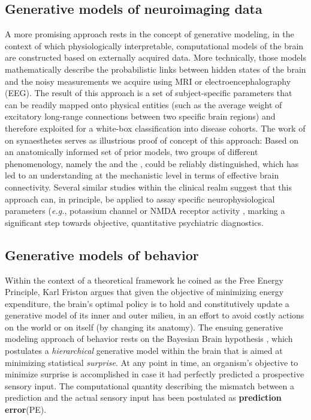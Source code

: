 \documentclass{article}
\begin{document}
\begin{multicols}{2}
\subsection*{Generative models of neuroimaging data}
A more promising approach rests in the concept of \textsf{generative modeling}, in the context of which physiologically interpretable, computational models of the brain are constructed based on externally acquired data. More technically, those models mathematically describe the probabilistic links between hidden states of the brain and the noisy measurements we acquire using MRI or electroencephalography (EEG). The result of this approach is a set of subject-specific parameters that can be readily mapped onto physical entities (such as the average weight of excitatory long-range connections between two specific brain regions) and therefore exploited for a white-box classification into disease cohorts. The work of \cite{VanLeeuwen2011} on synaesthetes serves as illustrious proof of concept of this approach: Based on an anatomically informed set of prior models, two groups of different phenomenology, namely the  and the , could be reliably distinguished, which has led to an understanding at the mechanistic level in terms of effective brain connectivity. Several similar studies within the clinical realm suggest that this approach can, in principle, be applied to assay specific neurophysiological parameters (\textit{e.g.}, potassium channel \citep{Gilbert2016} or NMDA receptor activity \citep{Symmonds2018a}, marking a significant step towards objective, quantitative psychiatric diagnostics.
\subsection*{Generative models of behavior}
Within the context of a theoretical framework he coined as the \textsf{Free Energy Principle}, Karl Friston argues that given the objective of minimizing energy expenditure, the brain's optimal policy is to hold and constitutively update a generative model of its inner and outer milieu, in an effort to avoid costly \textsf{actions} on the world or on itself (by changing its anatomy). The ensuing generative modeling approach of behavior rests on the Bayesian Brain hypothesis \citep{Friston2012}, which postulates a \textit{hierarchical} generative model within the brain that is aimed at minimizing statistical \textit{surprise}. At any point in time, an organism's objective to minimize surprise is accomplished in case it had perfectly predicted a prospective sensory input.  The computational quantity describing the mismatch between a prediction and the actual sensory input has been postulated as \textbf{prediction error}(PE).


\end{multicols}
\end{document}
